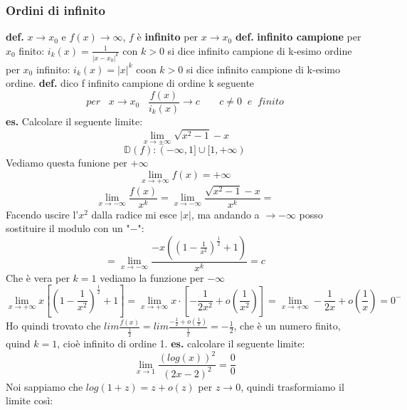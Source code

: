 \subsubsection*{Ordini di infinito}
\textbf{def.} $x \rightarrow  x_0$ e $f(x) \rightarrow \infty$, $f$ è \textbf{infinito} per $x \rightarrow x_0$
\newline
\newline
\textbf{def.} \textbf{infinito campione} 
\newline
per $x_0$ finito: $i_k(x) = \frac{1}{|x-x_0|^k}$ con $k > 0$ si dice infinito campione di k-esimo ordine
\newline
per $x_0$ infinito: $i_k(x) = |x|^k$ coon $k>0$ si dice infinito campione di k-esimo ordine.
\newline
\newline
\textbf{def.} dico f infinito campione di ordine k seguente
\[
    per \;\;\; x \rightarrow  x_0 \;\;\; \frac{f(x)}{i_k(x)} \rightarrow c \;\;\;\;\;\;\; c \neq 0 \;\;e \;\;finito
\]
\newline
\newline
\newline
\textbf{es.} Calcolare il seguente limite:
\[
    \lim_{x\rightarrow \pm\infty}\sqrt{x^2-1} -x
\]
\[
    \mathbb{D}(f) : (- \infty,1] \cup [1, + \infty)
\]
Vediamo questa funione per $+ \infty$
\[
    \lim_{x\rightarrow +\infty} f(x) = + \infty
\]
\[
    \lim_{x\rightarrow -\infty}\frac{f(x)}{x^k} = \lim_{x\rightarrow -\infty}\frac{\sqrt{x^2-1} -x}{x^k} =
\]
Facendo uscire l'$x^2$ dalla radice mi esce $|x|$, ma andando a $\rightarrow  -\infty$ posso sostituire il modulo con un "$-$":
\[
    =\lim_{x\rightarrow -\infty} \frac{-x((1-\frac{1}{x^2})^{\frac{1}{2}}+1)}{x^k} = c
\]
Che è vera per $k=1$
\newline
vediamo la funzione per $- \infty$
\[
    \lim_{x\rightarrow +\infty} x [(1 - \frac{1}{x^2})^{\frac{1}{2}}+1] = \lim_{x\rightarrow +\infty } x \cdot [-\frac{1}{2x^2} + o(\frac{1}{x^2})]= \lim_{x\rightarrow +\infty} - \frac{1}{2x} + o(\frac{1}{x}) = 0^-
\]
Ho quindi trovato che $lim \frac{f(x)}{\frac{1}{2}} = lim \frac{-\frac{1}{2} + o(\frac{1}{x})}{\frac{1}{x}} = - \frac{1}{2} $, che è un numero finito, quind $k = 1$, cioè infinito di ordine 1.
\newline
\newline
\newline
\textbf{es.} calcolare il seguente limite:
\[
    \lim_{x\rightarrow 1} \frac{(log(x))^2}{(2x-2)^2} = \frac{0}{0}
\]
Noi sappiamo che $log(1+z) = z + o(z)$ per $z \rightarrow 0$, quindi trasformiamo il limite così:
